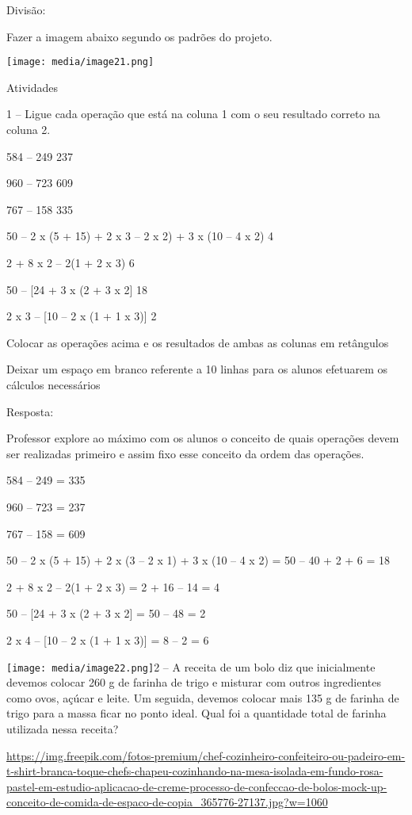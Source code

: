 Divisão:

Fazer a imagem abaixo segundo os padrões do projeto.

\texttt{[image: media/image21.png]}

Atividades

1 -- Ligue cada operação que está na coluna 1 com o seu resultado
correto na coluna 2.

584 -- 249 237

960 -- 723 609

767 -- 158 335

50 -- 2 x (5 + 15) + 2 x 3 -- 2 x 2) + 3 x (10 -- 4 x 2) 4

2 + 8 x 2 -- 2(1 + 2 x 3) 6

50 -- {[}24 + 3 x (2 + 3 x 2{]} 18

2 x 3 -- {[}10 -- 2 x (1 + 1 x 3){]} 2

Colocar as operações acima e os resultados de ambas as colunas em
retângulos

Deixar um espaço em branco referente a 10 linhas para os alunos
efetuarem os cálculos necessários

Resposta:

Professor explore ao máximo com os alunos o conceito de quais operações
devem ser realizadas primeiro e assim fixo esse conceito da ordem das
operações.

584 -- 249 = 335

960 -- 723 = 237

767 -- 158 = 609

50 -- 2 x (5 + 15) + 2 x (3 -- 2 x 1) + 3 x (10 -- 4 x 2) = 50 -- 40 + 2
+ 6 = 18

2 + 8 x 2 -- 2(1 + 2 x 3) = 2 + 16 -- 14 = 4

50 -- {[}24 + 3 x (2 + 3 x 2{]} = 50 -- 48 = 2

2 x 4 -- {[}10 -- 2 x (1 + 1 x 3){]} = 8 -- 2 = 6

\texttt{[image: media/image22.png]}2
-- A receita de um bolo diz que inicialmente devemos colocar 260 g de
farinha de trigo e misturar com outros ingredientes como ovos, açúcar e
leite. Um seguida, devemos colocar mais 135 g de farinha de trigo para a
massa ficar no ponto ideal. Qual foi a quantidade total de farinha
utilizada nessa receita?

\url{https://img.freepik.com/fotos-premium/chef-cozinheiro-confeiteiro-ou-padeiro-em-t-shirt-branca-toque-chefs-chapeu-cozinhando-na-mesa-isolada-em-fundo-rosa-pastel-em-estudio-aplicacao-de-creme-processo-de-confeccao-de-bolos-mock-up-conceito-de-comida-de-espaco-de-copia_365776-27137.jpg?w=1060}

